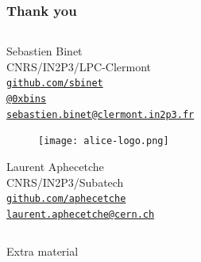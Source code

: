 \documentclass[9pt]{beamer}
\newcommand{\myblue} [1] {{\color{blue}#1}}
\begin{document}
\begin{frame}[fragile]
\frametitle{Thank you}


	\begin{columns}
		\begin{column}{0.49\textwidth}
	\begin{block}{}
Sebastien Binet\\
CNRS/IN2P3/LPC-Clermont\\
\myblue{\href{https://github.com/sbinet}{\texttt{github.com/sbinet}}}\\
\myblue{\href{https://twitter.com/0xb1ns}{\texttt{@0xbins}}}\\
\myblue{\href{mailto:sebastien.binet@clermont.in2p3.fr}{\texttt{sebastien.binet@clermont.in2p3.fr}}}\\
	\end{block}

\begin{figure}[h]
\begin{center}
\texttt{[image: alice-logo.png]}
\end{center}

\end{figure}


	\begin{block}{}
Laurent Aphecetche\\
CNRS/IN2P3/Subatech\\
\myblue{\href{https://github.com/aphecetche}{\texttt{github.com/aphecetche}}}\\
\myblue{\href{mailto:laurent.aphecetche@cern.ch}{\texttt{laurent.aphecetche@cern.ch}}}\\
	\end{block}
		\end{column}
	\end{columns}



\end{frame}

\begin{frame}[fragile]

	\begin{columns}
		\begin{column}{0.49\textwidth}
			\begin{exampleblock}{}
				\begin{center}
					Extra material
				\end{center}
			\end{exampleblock}
		\end{column}
	\end{columns}

\end{frame}
\end{document}
